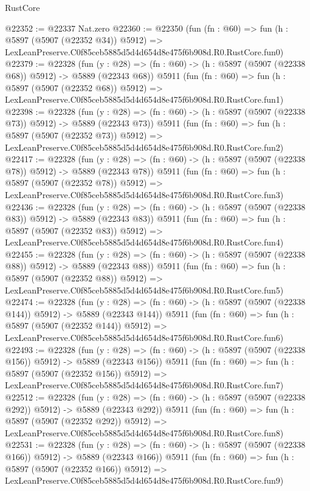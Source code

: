 \begin{lexlean}{RustCore}
\begin{coremodule}
@22352 := @22337 Nat.zero
@22360 := @22350
    (fun (fn : @60) =>
    fun (h : @5897 (@5907 (@22352 @34)) @5912) =>
    LexLeanPreserve.C0f85ceb5885d5d4d654d8e475f6b908d.R0.RustCore.fun0)
@22379 := @22328
    (fun (y : @28) => (fn : @60) -> (h : @5897 (@5907 (@22338 @68)) @5912) -> @5889 (@22343 @68))
    @5911
    (fun (fn : @60) =>
    fun (h : @5897 (@5907 (@22352 @68)) @5912) =>
    LexLeanPreserve.C0f85ceb5885d5d4d654d8e475f6b908d.R0.RustCore.fun1)
@22398 := @22328
    (fun (y : @28) => (fn : @60) -> (h : @5897 (@5907 (@22338 @73)) @5912) -> @5889 (@22343 @73))
    @5911
    (fun (fn : @60) =>
    fun (h : @5897 (@5907 (@22352 @73)) @5912) =>
    LexLeanPreserve.C0f85ceb5885d5d4d654d8e475f6b908d.R0.RustCore.fun2)
@22417 := @22328
    (fun (y : @28) => (fn : @60) -> (h : @5897 (@5907 (@22338 @78)) @5912) -> @5889 (@22343 @78))
    @5911
    (fun (fn : @60) =>
    fun (h : @5897 (@5907 (@22352 @78)) @5912) =>
    LexLeanPreserve.C0f85ceb5885d5d4d654d8e475f6b908d.R0.RustCore.fun3)
@22436 := @22328
    (fun (y : @28) => (fn : @60) -> (h : @5897 (@5907 (@22338 @83)) @5912) -> @5889 (@22343 @83))
    @5911
    (fun (fn : @60) =>
    fun (h : @5897 (@5907 (@22352 @83)) @5912) =>
    LexLeanPreserve.C0f85ceb5885d5d4d654d8e475f6b908d.R0.RustCore.fun4)
@22455 := @22328
    (fun (y : @28) => (fn : @60) -> (h : @5897 (@5907 (@22338 @88)) @5912) -> @5889 (@22343 @88))
    @5911
    (fun (fn : @60) =>
    fun (h : @5897 (@5907 (@22352 @88)) @5912) =>
    LexLeanPreserve.C0f85ceb5885d5d4d654d8e475f6b908d.R0.RustCore.fun5)
@22474 := @22328
    (fun (y : @28) => (fn : @60) -> (h : @5897 (@5907 (@22338 @144)) @5912) -> @5889 (@22343 @144))
    @5911
    (fun (fn : @60) =>
    fun (h : @5897 (@5907 (@22352 @144)) @5912) =>
    LexLeanPreserve.C0f85ceb5885d5d4d654d8e475f6b908d.R0.RustCore.fun6)
@22493 := @22328
    (fun (y : @28) => (fn : @60) -> (h : @5897 (@5907 (@22338 @156)) @5912) -> @5889 (@22343 @156))
    @5911
    (fun (fn : @60) =>
    fun (h : @5897 (@5907 (@22352 @156)) @5912) =>
    LexLeanPreserve.C0f85ceb5885d5d4d654d8e475f6b908d.R0.RustCore.fun7)
@22512 := @22328
    (fun (y : @28) => (fn : @60) -> (h : @5897 (@5907 (@22338 @292)) @5912) -> @5889 (@22343 @292))
    @5911
    (fun (fn : @60) =>
    fun (h : @5897 (@5907 (@22352 @292)) @5912) =>
    LexLeanPreserve.C0f85ceb5885d5d4d654d8e475f6b908d.R0.RustCore.fun8)
@22531 := @22328
    (fun (y : @28) => (fn : @60) -> (h : @5897 (@5907 (@22338 @166)) @5912) -> @5889 (@22343 @166))
    @5911
    (fun (fn : @60) =>
    fun (h : @5897 (@5907 (@22352 @166)) @5912) =>
    LexLeanPreserve.C0f85ceb5885d5d4d654d8e475f6b908d.R0.RustCore.fun9)

\end{coremodule}
\end{lexlean}
